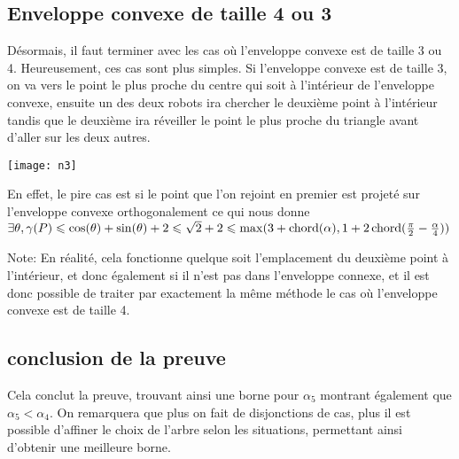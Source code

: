 \subsection{Enveloppe convexe de taille 4 ou 3}\label{conv3}

Désormais, il faut terminer avec les cas où l'enveloppe convexe est de taille 3 ou 4. Heureusement, ces cas sont plus simples.
Si l'enveloppe convexe est de taille 3, on va vers le point le plus proche du centre qui soit à l'intérieur de l'enveloppe convexe, ensuite un des deux robots ira chercher le deuxième point à l'intérieur tandis que le deuxième ira réveiller le point le plus proche du triangle avant d'aller sur les deux autres.

  \texttt{[image: n3]}

En effet, le pire cas est si le point que l'on rejoint en premier est projeté sur l'enveloppe convexe orthogonalement ce qui nous donne $\exists \theta, \gamma(P) \leqslant \cos(\theta) + \sin(\theta) + 2 \leqslant \sqrt{2} + 2 \leqslant \max(3 + \operatorname{chord}(\alpha), 1 + 2\operatorname{chord}(\frac{\pi}{2} - \frac{\alpha}{4}))$

Note: En réalité, cela fonctionne quelque soit l'emplacement du deuxième point à l'intérieur, et donc également si il n'est pas dans l'enveloppe connexe, et il est donc possible de traiter par exactement la même méthode le cas où l'enveloppe convexe est de taille 4.

\subsection{conclusion de la preuve}

Cela conclut la preuve, trouvant ainsi une borne pour $\alpha_5$ montrant également que $\alpha_5 < \alpha_4$. On remarquera que plus on fait de disjonctions de cas, plus il est possible d'affiner le choix de l'arbre selon les situations, permettant ainsi d'obtenir une meilleure borne.